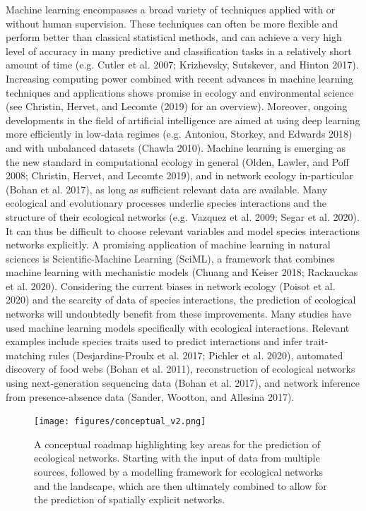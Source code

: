 \documentclass[11pt]{article}
\begin{document}
Machine learning encompasses a broad variety of techniques applied with
or without human supervision. These techniques can often be more
flexible and perform better than classical statistical methods, and can
achieve a very high level of accuracy in many predictive and
classification tasks in a relatively short amount of time (e.g. Cutler
et al. 2007; Krizhevsky, Sutskever, and Hinton 2017). Increasing
computing power combined with recent advances in machine learning
techniques and applications shows promise in ecology and environmental
science (see Christin, Hervet, and Lecomte (2019) for an overview).
Moreover, ongoing developments in the field of artificial intelligence
are aimed at using deep learning more efficiently in low-data regimes
(e.g. Antoniou, Storkey, and Edwards 2018) and with unbalanced datasets
(Chawla 2010). Machine learning is emerging as the new standard in
computational ecology in general (Olden, Lawler, and Poff 2008;
Christin, Hervet, and Lecomte 2019), and in network ecology
in-particular (Bohan et al. 2017), as long as sufficient relevant data
are available. Many ecological and evolutionary processes underlie
species interactions and the structure of their ecological networks
(e.g. Vazquez et al. 2009; Segar et al. 2020). It can thus be difficult
to choose relevant variables and model species interactions networks
explicitly. A promising application of machine learning in natural
sciences is Scientific-Machine Learning (SciML), a framework that
combines machine learning with mechanistic models (Chuang and Keiser
2018; Rackauckas et al. 2020). Considering the current biases in network
ecology (Poisot et al. 2020) and the scarcity of data of species
interactions, the prediction of ecological networks will undoubtedly
benefit from these improvements. Many studies have used machine learning
models specifically with ecological interactions. Relevant examples
include species traits used to predict interactions and infer
trait-matching rules (Desjardins-Proulx et al. 2017; Pichler et al.
2020), automated discovery of food webs (Bohan et al. 2011),
reconstruction of ecological networks using next-generation sequencing
data (Bohan et al. 2017), and network inference from presence-absence
data (Sander, Wootton, and Allesina 2017).

\begin{figure}
\hypertarget{fig:conceptual}{%
\centering
\texttt{[image: figures/conceptual\_v2.png]}
\caption{A conceptual roadmap highlighting key areas for the prediction
of ecological networks. Starting with the input of data from multiple
sources, followed by a modelling framework for ecological networks and
the landscape, which are then ultimately combined to allow for the
prediction of spatially explicit networks.}\label{fig:conceptual}
}
\end{figure}
\end{document}
